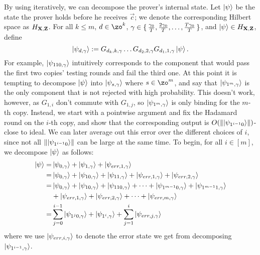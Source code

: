 By using  iteratively, we can decompose the prover's internal state.
Let $\ket{\psi}$ be the state the prover holds before he receives $\vec{c}$;
we denote the corresponding Hilbert space as $H_{\mathbf{X},\mathbf{Z}}$.
For all $k\leq m$, $d\in \zo^k$, $\gamma\in\set{\frac{\gamma_0}{T},\frac{2\gamma_0}{T},\dots,\frac{T\gamma_0}{T}}$, and $\ket{\psi} \in H_{\mathbf{X},\mathbf{Z}}$, define
$$\ket{\psi_{d,\gamma}}:= G_{d_k,k,\gamma}\ldots G_{d_2,2,\gamma} G_{d_1,1,\gamma} \ket{\psi}.$$
For example, $\ket{\psi_{110, \gamma}}$ intuitively corresponds to the component that would pass the first two copies' testing rounds and fail the third one.
At this point it is tempting to decompose $\ket{\psi}$ into $\ket{\psi_{s, \gamma}}$ where $s\in\zo^m$,
and say that $\ket{\psi_{1^m, \gamma}}$ is the only component that is not rejected with high probability.
This doesn't work, however, as $G_{1,i}$ don't commute with $G_{1,j}$, so $\ket{\psi_{1^m, \gamma}}$ is only binding for the $m$-th copy.
Instead, we start with a pointwise argument and fix the Hadamard round on the $i$-th copy,
and show that the corresponding output is $O(\left\lVert\ket{\psi_{1^{i-1}0}}\right\rVert)$-close to ideal.
We can later average out this error over the different choices of $i$, since not all $\left\lVert\ket{\psi_{1^{i-1}0}}\right\rVert$ can be large at the same time.
To begin, for all $i\in[m]$, we decompose $\ket{\psi}$ as follows: 
\begin{align} \label{eq:partition-string}
	\ket{\psi} =& \ket{\psi_{0,\gamma}}+\ket{\psi_{1,\gamma}}+\ket{\psi_{err,1,\gamma}} \nonumber \\
	=& \ket{\psi_{0,\gamma}}+\ket{\psi_{10,\gamma}}+\ket{\psi_{11,\gamma}}+\ket{\psi_{err,1,\gamma}}+\ket{\psi_{err,2,\gamma}} \nonumber \\
	=& \ket{\psi_{0,\gamma}}+\ket{\psi_{10,\gamma}}+\ket{\psi_{110,\gamma}}+\cdots+\ket{\psi_{1^{m-1}0,\gamma}}+\ket{\psi_{1^{m-1}1,\gamma}} \nonumber \\
	&+\ket{\psi_{err,1,\gamma}}+\ket{\psi_{err,2,\gamma}}+\cdots+\ket{\psi_{err,m,\gamma}} \nonumber\\
	=&\sum_{j=0}^{i-1} \ket{\psi_{1^j0,\gamma}} +\ket{\psi_{1^i,\gamma}} +\sum_{j=1}^{i}\ket{\psi_{err,j,\gamma}}
\end{align}
where we use $\ket{\psi_{err,i,\gamma}}$ to denote the error state we get from decomposing $\ket{\psi_{1^{i-1},\gamma}}$.



